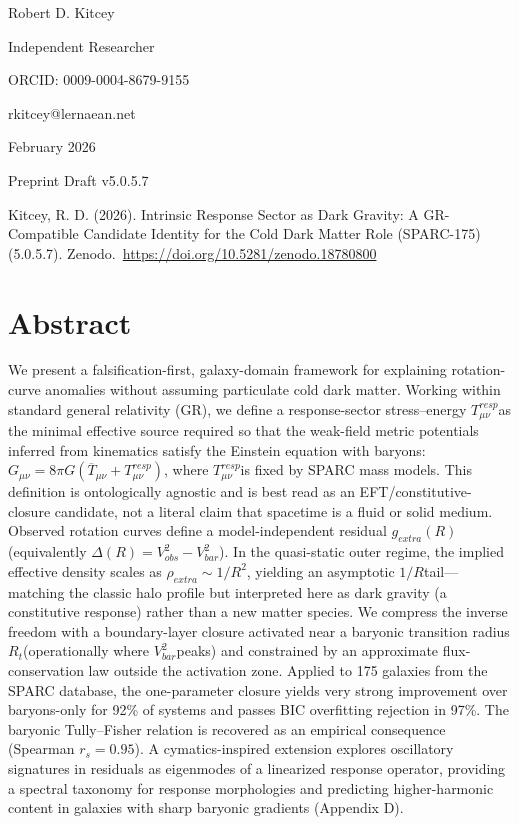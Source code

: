Robert D. Kitcey

Independent Researcher

ORCID: 0009-0004-8679-9155

rkitcey@lernaean.net

February 2026

Preprint Draft v5.0.5.7

Kitcey, R. D. (2026). Intrinsic Response Sector as Dark Gravity: A GR-Compatible Candidate Identity for the Cold Dark Matter Role (SPARC-175) (5.0.5.7). Zenodo.~\href{https://doi.org/10.5281/zenodo.1878080010.5281/zenodo.18780635}{https://doi.org/10.5281/zenodo.18780800}

\section{Abstract}\label{abstract}

We present a falsification-first, galaxy-domain framework for explaining rotation-curve anomalies without assuming particulate cold dark matter. Working within standard general relativity (GR), we define a response-sector stress--energy \(T_{\mu\nu}^{resp}\)as the minimal effective source required so that the weak-field metric potentials inferred from kinematics satisfy the Einstein equation with baryons: \(G_{\mu\nu} = 8\pi G(\overline{T}_{\mu\nu} + T_{\mu\nu}^{resp})\), where \(T_{\mu\nu}^{resp}\)is fixed by SPARC mass models. This definition is ontologically agnostic and is best read as an EFT/constitutive-closure candidate, not a literal claim that spacetime is a fluid or solid medium. Observed rotation curves define a model-independent residual \(g_{extra}(R)\)(equivalently \(\Delta(R) = V_{obs}^{2} - V_{bar}^{2}\)). In the quasi-static outer regime, the implied effective density scales as \(\rho_{extra} \sim 1/R^{2}\), yielding an asymptotic \(1/R\)tail---matching the classic halo profile but interpreted here as dark gravity (a constitutive response) rather than a new matter species. We compress the inverse freedom with a boundary-layer closure activated near a baryonic transition radius \(R_{t}\)(operationally where \(V_{bar}^{2}\)peaks) and constrained by an approximate flux-conservation law outside the activation zone. Applied to 175 galaxies from the SPARC database, the one-parameter closure yields very strong improvement over baryons-only for 92\% of systems and passes BIC overfitting rejection in 97\%. The baryonic Tully--Fisher relation is recovered as an empirical consequence (Spearman \(r_{s} = 0.95\)). A cymatics-inspired extension explores oscillatory signatures in residuals as eigenmodes of a linearized response operator, providing a spectral taxonomy for response morphologies and predicting higher-harmonic content in galaxies with sharp baryonic gradients (Appendix D).

